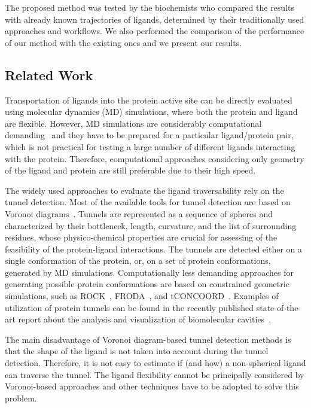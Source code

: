 \documentclass{bmcart}
\begin{document}
The proposed method was tested by the biochemists who compared the results with already known trajectories of ligands, determined by their traditionally used approaches and workflows.
We also performed the comparison of the performance of our method with the existing ones and we present our results.


\subsection*{Related Work}

Transportation of ligands into the protein active site can be directly evaluated using molecular dynamics (MD) simulations, where both the protein and ligand are flexible.
However, MD simulations are considerably computational demanding~\cite{kingsley2014including} and they have to be prepared
for a particular ligand/protein pair, which is not practical for testing a large number of different ligands interacting with the protein.
Therefore, computational approaches considering only geometry of the ligand and protein are still preferable due to their high speed.

The widely used approaches to evaluate the ligand traversability rely on the tunnel detection.
Most of the available tools for tunnel detection are based on Voronoi diagrams~\cite{yaffe2008,caver3,sehnal2013mole}.
Tunnels are represented as a sequence of spheres and characterized by their bottleneck, length, curvature, and the list of surrounding residues, whose physico-chemical properties are crucial for assessing of the feasibility of the protein-ligand interactions.
The tunnels are detected either on a single conformation of the protein, or, on a set of protein conformations, generated by MD simulations.
Computationally less demanding approaches for generating possible protein conformations are based on constrained geometric simulations, such as
ROCK~\cite{lei2004sampling}, FRODA~\cite{wells2005constrained}, and tCONCOORD~\cite{seeliger2007geometry}.
Examples of utilization of protein tunnels can be found in the recently published state-of-the-art report about the analysis and visualization of biomolecular cavities~\cite{Krone_2016}.

The main disadvantage of Voronoi diagram-based tunnel detection methods is that the shape of the ligand is not taken into account during the tunnel detection.
Therefore, it is not easy to estimate if (and how) a non-spherical ligand can traverse the tunnel.
The ligand flexibility cannot be principally considered by Voronoi-based approaches and other techniques have to be adopted to solve this problem.
\end{document}
